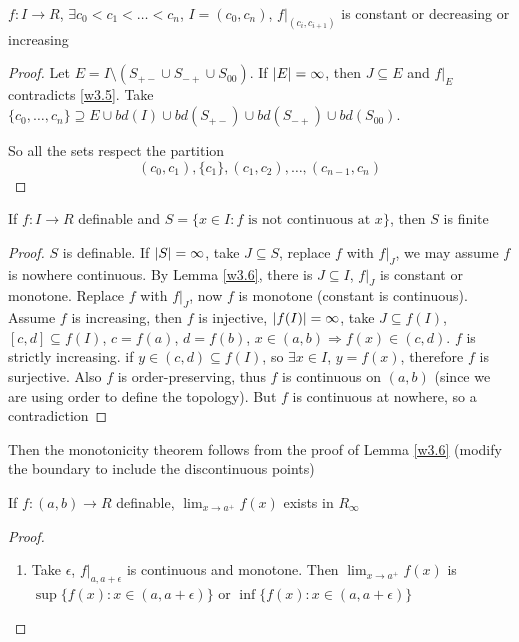 \documentclass[11pt]{article}
\begin{document}
\begin{lemma}[]
\label{w3.6}
\(f:I\to R\), \(\exists c_0<c_1<\dots<c_n\), \(I=(c_0,c_n)\), \(f|_{(c_i,c_{i+1})}\) is constant or decreasing
or increasing
\end{lemma}

\begin{proof}
Let \(E=I\setminus(S_{+-}\cup S_{-+}\cup S_{00})\). If \(\abs{E}=\infty\), then \(J\subseteq E\)
and \(f|_E\) contradicts \ref{w3.5}.
Take \(\{c_0,\dots,c_n\}\supseteq E\cup bd(I)\cup bd(S_{+-})\cup bd(S_{-+})\cup bd(S_{00})\).

So all the sets respect the partition
\begin{equation*}
(c_0,c_1),\{c_1\},(c_1,c_2),\dots,(c_{n-1},c_n)
\end{equation*}
\end{proof}

\begin{lemma}[]
\label{w3.7}
If \(f:I\to R\) definable and \(S=\{x\in I:f\text{ is not continuous at }x\}\), then \(S\) is finite
\end{lemma}

\begin{proof}
\(S\) is definable. If \(\abs{S}=\infty\), take \(J\subseteq S\), replace \(f\) with \(f|_J\), we may
assume \(f\) is nowhere continuous. By Lemma \ref{w3.6}, there is \(J\subseteq I\), \(f|_J\) is constant
or monotone. Replace \(f\) with \(f|_J\), now \(f\) is monotone (constant is continuous).
Assume \(f\) is increasing, then \(f\) is injective, \(\abs{f(I)}=\infty\),
take \(J\subseteq f(I)\), \([c,d]\subseteq f(I)\), \(c=f(a)\), \(d=f(b)\), \(x\in(a,b)\Rightarrow f(x)\in(c,d)\). \(f\) is
strictly increasing. if \(y\in(c,d)\subseteq f(I)\), so \(\exists x\in I\), \(y=f(x)\), therefore \(f\) is
surjective. Also \(f\) is order-preserving, thus \(f\) is continuous on \((a,b)\) (since we are
using order to define the topology). But \(f\) is continuous at nowhere, so a contradiction
\end{proof}

Then the monotonicity theorem follows from the proof of Lemma \ref{w3.6} (modify the boundary to
include the discontinuous points)

\begin{corollary}[]
If \(f:(a,b)\to R\) definable, \(\lim_{x\to a^+}f(x)\) exists in \(R_{\infty}\)
\end{corollary}

\begin{proof}
\begin{enumerate}
\item Take \(\epsilon\), \(f|_{a,a+\epsilon}\) is continuous and monotone. Then \(\lim_{x\to a^+}f(x)\)
is \(\sup\{f(x):x\in(a,a+\epsilon)\}\) or \(\inf\{f(x):x\in(a,a+\epsilon)\}\)
\end{enumerate}
\end{proof}
\end{document}
